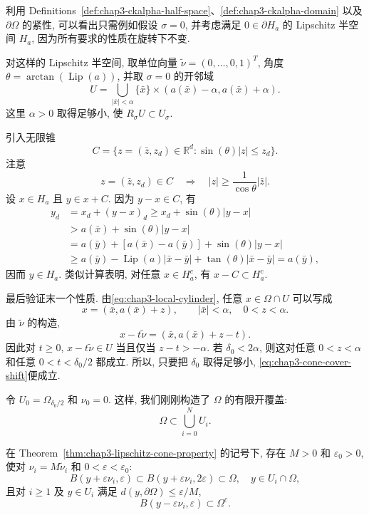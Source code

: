 \begin{Proof}
利用 Definitions~\ref{def:chap3-ckalpha-half-space}、\ref{def:chap3-ckalpha-domain} 以及 $\partial\Omega$ 的紧性, 可以看出只需例如假设 $\sigma=0$, 并考虑满足 $0\in\partial H_a$ 的 Lipschitz 半空间 $H_a$, 因为所有要求的性质在旋转下不变.

对这样的 Lipschitz 半空间, 取单位向量 $\widetilde\nu=(0,\ldots,0,1)^T$, 角度 $\theta=\arctan(\operatorname{Lip}(a))$, 并取 $\sigma=0$ 的开邻域
\begin{equation}
 U=\bigcup_{|\bar x|<\alpha}\{\bar x\}\times(a(\bar x)-\alpha,a(\bar x)+\alpha).
 \label{eq:chap3-local-cylinder}
\end{equation}
这里 $\alpha>0$ 取得足够小, 使 $R_\sigma U\subset U_\sigma$.

引入无限锥
\[
 C=\{z=(\bar z,z_d)\in\mathbb R^d:\sin(\theta)|z|\leq z_d\}.
\]
注意
\[
 z=(\bar z,z_d)\in C\quad\Longrightarrow\quad
 |z|\geq\frac1{\cos\theta}|\bar z|.
\]
设 $x\in H_a$ 且 $y\in x+C$. 因为 $y-x\in C$, 有
\[
\begin{aligned}
 y_d
 &=x_d+(y-x)_d
 \geq x_d+\sin(\theta)|y-x|\\
 &>a(\bar x)+\sin(\theta)|y-x|\\
 &=a(\bar y)+[a(\bar x)-a(\bar y)]+\sin(\theta)|y-x|\\
 &\geq a(\bar y)-\operatorname{Lip}(a)|\bar x-\bar y|
 +\tan(\theta)|\bar x-\bar y|
 =a(\bar y),
\end{aligned}
\]
因而 $y\in H_a$. 类似计算表明, 对任意 $x\in H_a^c$, 有 $x-C\subset H_a^c$.

最后验证末一个性质. 由\eqref{eq:chap3-local-cylinder}, 任意 $x\in\Omega\cap U$ 可以写成
\[
 x=(\bar x,a(\bar x)+z),
 \qquad |\bar x|<\alpha,\quad0<z<\alpha.
\]
由 $\widetilde\nu$ 的构造,
\[
 x-t\widetilde\nu=(\bar x,a(\bar x)+z-t).
\]
因此对 $t\geq0$, $x-t\widetilde\nu\in U$ 当且仅当 $z-t>-\alpha$. 若 $\delta_0<2\alpha$, 则这对任意 $0<z<\alpha$ 和任意 $0<t<\delta_0/2$ 都成立. 所以, 只要把 $\delta_0$ 取得足够小, \eqref{eq:chap3-cone-cover-shift}便成立.
\end{Proof}

令 $U_0=\Omega_{\delta_0/2}$ 和 $\nu_0=0$.
这样, 我们刚刚构造了 $\Omega$ 的有限开覆盖:
\[
 \Omega\subset\bigcup_{i=0}^NU_i.
\]

\begin{Proposition}
\label{prop:chap3-shifted-balls-cone}
在 Theorem~\ref{thm:chap3-lipschitz-cone-property} 的记号下, 存在 $M>0$ 和 $\varepsilon_0>0$, 使对 $\nu_i=M\widetilde\nu_i$ 和 $0<\varepsilon<\varepsilon_0$:
\begin{equation}
 B(y+\varepsilon\nu_i,\varepsilon)
 \subset B(y+\varepsilon\nu_i,2\varepsilon)\subset\Omega,
 \quad y\in U_i\cap\Omega,
 \label{eq:chap3-inward-shifted-ball}
\end{equation}
且对 $i\geq1$ 及 $y\in U_i$ 满足 $d(y,\partial\Omega)\leq\varepsilon/M$,
\begin{equation}
 B(y-\varepsilon\nu_i,\varepsilon)\subset\Omega^c.
 \label{eq:chap3-outward-shifted-ball}
\end{equation}
\end{Proposition}

